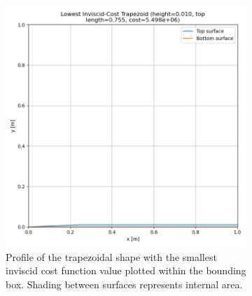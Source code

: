 \documentclass[11pt]{article}
\begin{document}
\begin{figure}[H]
\begin{subfigure}[b]{0.44\textwidth}
    \includegraphics[width=\linewidth]{../results/inviscid/lowest_cost_trapezoid.png}
    \caption{Profile of the trapezoidal shape with the smallest inviscid cost function value plotted within the bounding box. Shading between surfaces represents internal area.}
    \label{fig:inv-trapezoid-b}
\end{subfigure}
\caption{}
\label{fig:inv-trapezoid}
\end{figure}
\end{document}
